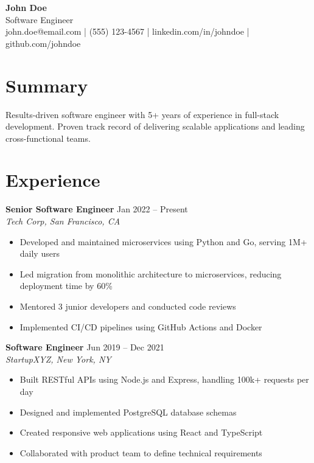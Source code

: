 \documentclass[11pt,a4paper]{article}
\begin{document}
\begin{center}
    \textbf{\Large John Doe} \\
    \vspace{0.1cm}
    Software Engineer \\
    \vspace{0.1cm}
    john.doe@email.com | (555) 123-4567 | linkedin.com/in/johndoe | github.com/johndoe
\end{center}

\section*{Summary}
Results-driven software engineer with 5+ years of experience in full-stack development. Proven track record of delivering scalable applications and leading cross-functional teams.

\section*{Experience}

\textbf{Senior Software Engineer} \hfill Jan 2022 -- Present \\
\textit{Tech Corp, San Francisco, CA}
\begin{itemize}[leftmargin=*, nosep]
    \item Developed and maintained microservices using Python and Go, serving 1M+ daily users
    \item Led migration from monolithic architecture to microservices, reducing deployment time by 60\%
    \item Mentored 3 junior developers and conducted code reviews
    \item Implemented CI/CD pipelines using GitHub Actions and Docker
\end{itemize}

\textbf{Software Engineer} \hfill Jun 2019 -- Dec 2021 \\
\textit{StartupXYZ, New York, NY}
\begin{itemize}[leftmargin=*, nosep]
    \item Built RESTful APIs using Node.js and Express, handling 100k+ requests per day
    \item Designed and implemented PostgreSQL database schemas
    \item Created responsive web applications using React and TypeScript
    \item Collaborated with product team to define technical requirements
\end{itemize}
\end{document}
